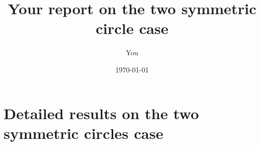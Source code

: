 \documentclass{article}
\title{Your report on the two symmetric circle case}
\author[1]{You}
\affil[1]{Your affiliation}
\date{\today}
\begin{document}
\maketitle

\section{Detailed results on the two symmetric circles case}\label{app:1a}

\end{document}

